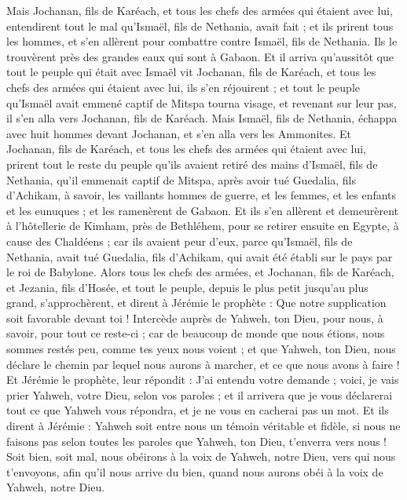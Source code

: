 \begin{multicols}{2}
Mais Jochanan, fils de Karéach, et tous les chefs des armées qui étaient avec lui, entendirent tout le mal qu'Ismaël, fils de Nethania, avait fait ;
et ils prirent tous les hommes, et s'en allèrent pour combattre contre Ismaël, fils de Nethania. Ils le trouvèrent près des grandes eaux qui sont à Gabaon.
Et il arriva qu'aussitôt que tout le peuple qui était avec Ismaël vit Jochanan, fils de Karéach, et tous les chefs des armées qui étaient avec lui, ils s'en réjouirent ;
et tout le peuple qu'Ismaël avait emmené captif de Mitspa tourna visage, et revenant sur leur pas, il s'en alla vers Jochanan, fils de Karéach.
Mais Ismaël, fils de Nethania, échappa avec huit hommes devant Jochanan, et s'en alla vers les Ammonites.
Et Jochanan, fils de Karéach, et tous les chefs des armées qui étaient avec lui, prirent tout le reste du peuple qu'ils avaient retiré des mains d'Ismaël, fils de Nethania, qu'il emmenait captif de Mitspa, après avoir tué Guedalia, fils d'Achikam, à savoir, les vaillants hommes de guerre, et les femmes, et les enfants et les eunuques ; et les ramenèrent de Gabaon.
Et ils s'en allèrent et demeurèrent à l'hôtellerie de Kimham, près de Bethléhem, pour se retirer ensuite en Egypte,
à cause des Chaldéens ; car ils avaient peur d'eux, parce qu'Ismaël, fils de Nethania, avait tué Guedalia, fils d'Achikam, qui avait été établi sur le pays par le roi de Babylone.
\VerseOne{}Alors tous les chefs des armées, et Jochanan, fils de Karéach, et Jezania, fils d'Hosée, et tout le peuple, depuis le plus petit jusqu'au plus grand, s'approchèrent,
et dirent à Jérémie le prophète : Que notre supplication soit favorable devant toi ! Intercède auprès de Yahweh, ton Dieu, pour nous, à savoir, pour tout ce reste-ci ; car de beaucoup de monde que nous étions, nous sommes restés peu, comme tes yeux nous voient ;
et que Yahweh, ton Dieu, nous déclare le chemin par lequel nous aurons à marcher, et ce que nous avons à faire !
Et Jérémie le prophète, leur répondit : J'ai entendu votre demande ; voici, je vais prier Yahweh, votre Dieu, selon vos paroles ; et il arrivera que je vous déclarerai tout ce que Yahweh vous répondra, et je ne vous en cacherai pas un mot.
Et ils dirent à Jérémie : Yahweh soit entre nous un témoin véritable et fidèle, si nous ne faisons pas selon toutes les paroles que Yahweh, ton Dieu, t'enverra vers nous !
Soit bien, soit mal, nous obéirons à la voix de Yahweh, notre Dieu, vers qui nous t'envoyons, afin qu'il nous arrive du bien, quand nous aurons obéi à la voix de Yahweh, notre Dieu.

\end{multicols}
